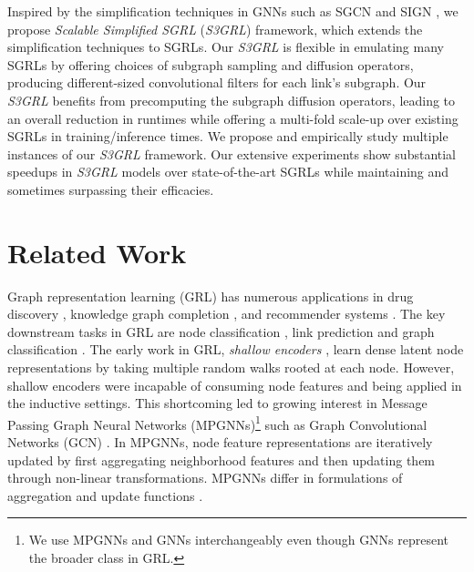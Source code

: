 \documentclass[sigconf, nonacm]{acmart}
\newcommand{\ssgrl}{\textit{S3GRL}\xspace}
\begin{document}
Inspired by the simplification techniques in GNNs such as SGCN \cite{wu2019simplifying} and SIGN \cite{sign_icml_grl2020}, we propose \textit{Scalable Simplified  SGRL} (\ssgrl) framework, which extends the simplification techniques to SGRLs. Our \ssgrl is flexible in emulating many SGRLs by offering choices of subgraph sampling and diffusion operators, producing different-sized convolutional filters for each link's subgraph. Our \ssgrl benefits from precomputing the subgraph diffusion operators, leading to an overall reduction in runtimes while offering a multi-fold scale-up over existing SGRLs in training/inference times. We propose and empirically study multiple instances of our \ssgrl framework. Our extensive experiments show substantial speedups in \ssgrl models over state-of-the-art SGRLs while maintaining and sometimes surpassing their efficacies.


\section{Related Work}
\label{sec:relwork}
Graph representation learning (GRL) \cite{hamilton2020graph} has numerous applications in drug discovery \cite{xiong2019pushing}, knowledge graph completion \cite{zhang2020relational}, and recommender systems \cite{ying2018graph}. The key downstream tasks in GRL are node classification \cite{hamilton2017inductive}, link prediction \cite{zhang2018link} and graph classification \cite{zhang2018end}. The early work in GRL, \textit{shallow encoders} \cite{perozzi2014deepwalk,grover2016node2vec}, learn dense latent node representations by taking multiple random walks rooted at each node. However, shallow encoders were incapable of consuming node features and being applied in the inductive settings. This shortcoming led to growing interest in Message Passing Graph Neural Networks (MPGNNs)\footnote{We use MPGNNs and GNNs interchangeably even though GNNs represent the broader class in GRL.}
\cite{brunaspectral2014,defferrard2016convolutional} such as Graph Convolutional Networks (GCN) \cite{kipf2017semi}. In MPGNNs, node feature representations are iteratively updated by first aggregating neighborhood features and then updating them through non-linear transformations. MPGNNs differ in formulations of aggregation and update functions \cite{hamilton2020graph}.
\end{document}
